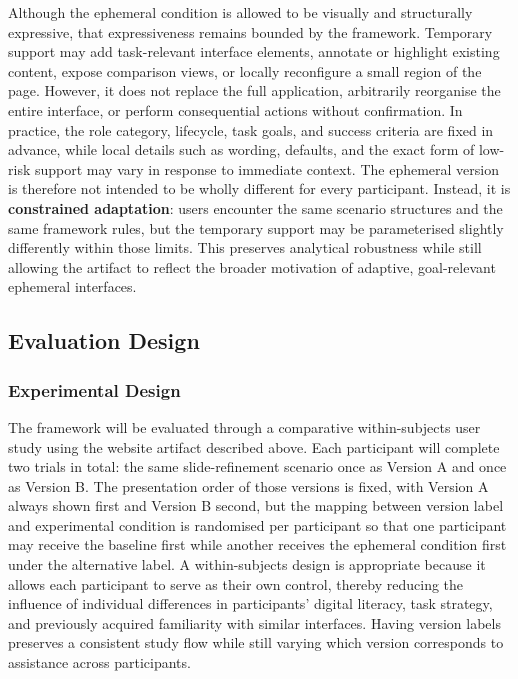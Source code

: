 Although the ephemeral condition is allowed to be visually and structurally expressive, that expressiveness remains bounded by the framework. Temporary support may add task-relevant interface elements, annotate or highlight existing content, expose comparison views, or locally reconfigure a small region of the page. However, it does not replace the full application, arbitrarily reorganise the entire interface, or perform consequential actions without confirmation. In practice, the role category, lifecycle, task goals, and success criteria are fixed in advance, while local details such as wording, defaults, and the exact form of low-risk support may vary in response to immediate context. The ephemeral version is therefore not intended to be wholly different for every participant. Instead, it is \textbf{constrained adaptation}: users encounter the same scenario structures and the same framework rules, but the temporary support may be parameterised slightly differently within those limits. This preserves analytical robustness while still allowing the artifact to reflect the broader motivation of adaptive, goal-relevant ephemeral interfaces.

\subsection{Evaluation Design}

\subsubsection{Experimental Design}

The framework will be evaluated through a comparative within-subjects user study using the website artifact described above. Each participant will complete two trials in total: the same slide-refinement scenario once as Version A and once as Version B. The presentation order of those versions is fixed, with Version A always shown first and Version B second, but the mapping between version label and experimental condition is randomised per participant so that one participant may receive the baseline first while another receives the ephemeral condition first under the alternative label. A within-subjects design is appropriate because it allows each participant to serve as their own control, thereby reducing the influence of individual differences in participants' digital literacy, task strategy, and previously acquired familiarity with similar interfaces. Having version labels preserves a consistent study flow while still varying which version corresponds to assistance across participants.

